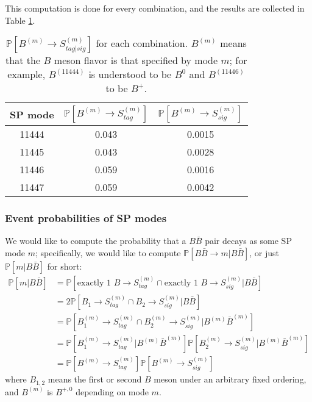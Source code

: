 \documentclass{article}
\newcommand{\Prob}[1]{\ensuremath{\mathbb{P}\left[#1\right]}}
\newcommand{\CondP}[2]{\ensuremath{\mathbb{P}\left[#1|#2\right]}}
\renewcommand{\(}{\left(}
\renewcommand{\)}{\right)}
\numberwithin{equation}{section}
\begin{document}
This computation is done for every combination, and the results are collected in Table \ref{b_to_s_prob}. 
\begin{table}[H]
  \begin{center}
    \begin{tabular}{ c c c }
      SP mode & $\Prob{B^{(m)}\rightarrow S^{(m)}_{tag}}$ & $\Prob{B^{(m)}\rightarrow S^{(m)}_{sig}}$ \\
      \hline\hline
      11444 & 0.043 & 0.0015 \\
      \hline
      11445 & 0.043 & 0.0028 \\
      \hline
      11446 & 0.059 & 0.0016 \\
      \hline
      11447 & 0.059 & 0.0042 \\
      \hline
    \end{tabular}
  \end{center}
  \caption{$\Prob{B^{(m)}\rightarrow S^{(m)}_{tag|sig}}$ for each combination. $B^{(m)}$ means that the $B$ meson flavor is that specified by mode $m$; for example, $B^{(11444)}$ is understood to be $B^0$ and $B^{(11446)}$ to be $B^+$.}  
  \label{b_to_s_prob}
\end{table}

\subsubsection{Event probabilities of SP modes}
We would like to compute the probability that a $B\bar{B}$ pair decays as some SP mode $m$; specifically, we would like to compute $\CondP{B\bar{B}\rightarrow m}{B\bar{B}}$, or just $\CondP{m}{B\bar{B}}$ for short:
\begin{align}
  \CondP{m}{B\bar{B}}
  &=\CondP{\text{exactly 1 }B\rightarrow S^{(m)}_{tag} \cap \text{exactly 1 } B\rightarrow S^{(m)}_{sig}}{B\bar{B}} \\
  &=2 \CondP{B_1\rightarrow S^{(m)}_{tag} \cap B_2\rightarrow S^{(m)}_{sig}}{B\bar{B}} \\
  &=\CondP{B^{(m)}_1\rightarrow S^{(m)}_{tag} \cap B^{(m)}_2\rightarrow S^{(m)}_{sig}}{B^{(m)}\bar{B}^{(m)}} \\
  &=\CondP{B^{(m)}_1\rightarrow S^{(m)}_{tag}}{B^{(m)}\bar{B}^{(m)}} \CondP{B^{(m)}_2\rightarrow S^{(m)}_{sig}}{B^{(m)}\bar{B}^{(m)}} \\
  &=\Prob{B^{(m)}\rightarrow S^{(m)}_{tag}} \Prob{B^{(m)}\rightarrow S^{(m)}_{sig}}
\end{align}
where $B_{1,2}$ means the first or second $B$ meson under an arbitrary fixed ordering, and $B^{(m)}$ is $B^{+,0}$ depending on mode $m$.
\end{document}
